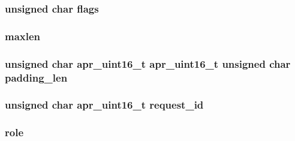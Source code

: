 \subsubsection[{\texorpdfstring{flags}{flags}}]{ unsigned char flags}\hypertarget{group__APACHE__CORE__FASTCGI_gac2156b926db9b93ef56c9b1e537db8cd}{}\label{group__APACHE__CORE__FASTCGI_gac2156b926db9b93ef56c9b1e537db8cd}
\subsubsection[{\texorpdfstring{maxlen}{maxlen}}]{ maxlen}\hypertarget{group__APACHE__CORE__FASTCGI_ga5c048510565a9f2b1d0680d211718866}{}\label{group__APACHE__CORE__FASTCGI_ga5c048510565a9f2b1d0680d211718866}
\subsubsection[{\texorpdfstring{padding\+\_\+len}{padding_len}}]{\setlength{\rightskip}{0pt plus 5cm}unsigned char {\bf apr\+\_\+uint16\+\_\+t} {\bf apr\+\_\+uint16\+\_\+t} unsigned char padding\+\_\+len}\hypertarget{group__APACHE__CORE__FASTCGI_ga02211035748387ac9d2576da9da159fb}{}\label{group__APACHE__CORE__FASTCGI_ga02211035748387ac9d2576da9da159fb}
\subsubsection[{\texorpdfstring{request\+\_\+id}{request_id}}]{\setlength{\rightskip}{0pt plus 5cm}unsigned char {\bf apr\+\_\+uint16\+\_\+t} request\+\_\+id}\hypertarget{group__APACHE__CORE__FASTCGI_ga7cf1c5551e313631cefe3e87006af0ce}{}\label{group__APACHE__CORE__FASTCGI_ga7cf1c5551e313631cefe3e87006af0ce}
\subsubsection[{\texorpdfstring{role}{role}}]{ role}\hypertarget{group__APACHE__CORE__FASTCGI_gaea7921a9aa2757a88e843476848ddd55}{}\label{group__APACHE__CORE__FASTCGI_gaea7921a9aa2757a88e843476848ddd55}
